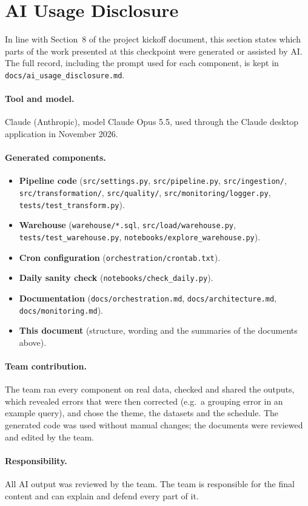 \documentclass[11pt,a4paper]{article}
\begin{document}
\section*{AI Usage Disclosure}
In line with Section~8 of the project kickoff document, this section states
which parts of the work presented at this checkpoint were generated or
assisted by AI. The full record, including the prompt used for each
component, is kept in \texttt{docs/ai\_usage\_disclosure.md}.

\paragraph{Tool and model.} Claude (Anthropic), model Claude Opus 5.5,
used through the Claude desktop application in November 2026.

\paragraph{Generated components.}
\begingroup\raggedright
\begin{itemize}
  \item \textbf{Pipeline code} (\texttt{src/settings.py},
        \texttt{src/pipeline.py}, \texttt{src/ingestion/},
        \texttt{src/transformation/}, \texttt{src/quality/},
        \texttt{src/monitoring/logger.py}, \texttt{tests/test\_transform.py}).
  \item \textbf{Warehouse} (\texttt{warehouse/*.sql},
        \texttt{src/load/warehouse.py}, \texttt{tests/test\_warehouse.py},
        \texttt{notebooks/explore\_warehouse.py}).
  \item \textbf{Cron configuration} (\texttt{orchestration/crontab.txt}).
  \item \textbf{Daily sanity check} (\texttt{notebooks/check\_daily.py}).
  \item \textbf{Documentation} (\texttt{docs/orchestration.md},
        \texttt{docs/architecture.md}, \texttt{docs/monitoring.md}).
  \item \textbf{This document} (structure, wording and the summaries of the
        documents above).
\end{itemize}
\endgroup

\paragraph{Team contribution.} The team ran every component on real data,
checked and shared the outputs, which revealed errors that were then
corrected (e.g.\ a grouping error in an example query), and chose the theme,
the datasets and the schedule. The generated code was used without manual
changes; the documents were reviewed and edited by the team.

\paragraph{Responsibility.}
All AI output was reviewed by the team. The team is responsible for the
final content and can explain and defend every part of it.
\end{document}
